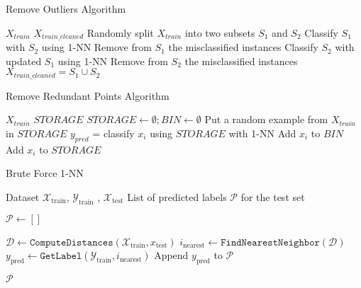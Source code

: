 \documentclass{article}
\theoremstyle{plain}
\theoremstyle{definition}
\theoremstyle{remark}
\begin{document}
    \begin{algorithm}[tb]
        \caption{Remove Outliers Algorithm}
        \label{alg:remove_outliers}
        \begin{algorithmic}
            $X_{train}$
            $X_{train\_cleaned}$
           \STATE Randomly split $X_{train}$ into two subsets $S_1$ and $S_2$
                \STATE Classify $S_1$ with $S_2$ using 1-NN
                \STATE Remove from $S_1$ the misclassified instances
                \STATE Classify $S_2$ with updated $S_1$ using 1-NN
                \STATE Remove from $S_2$ the misclassified instances
           \ENDWHILE
           \STATE $X_{train\_cleaned} = S_1 \cup S_2$
        \end{algorithmic}
    \end{algorithm}

    \begin{algorithm}[tb]
        \caption{Remove Redundant Points Algorithm}
        \label{alg:remove_redundancy}
        \begin{algorithmic}
            $X_{train}$
            $STORAGE$
           \STATE $STORAGE \gets \emptyset ; BIN \gets \emptyset$
           \STATE Put a random example from $X_{train}$ in $STORAGE$
                    \STATE $y_{pred}$ = classify $x_i$ using $STORAGE$ with 1-NN
                        \STATE Add $x_i$ to $BIN$
                    \ELSE
                        \STATE Add $x_i$ to $STORAGE$
                    \ENDIF
                \ENDFOR
           \ENDWHILE
        \end{algorithmic}
    \end{algorithm}

\begin{algorithm}[tb]
   \caption{Brute Force 1-NN}
   \label{alg:brute_force_1nn}
\begin{algorithmic}
    Dataset  $\mathcal{X}_{\text{train}}$, $\mathcal{Y}_{\text{train}}$ , $\mathcal{X}_{\text{test}}$
    List of predicted labels $\mathcal{P}$ for the test set

   \STATE $\mathcal{P} \gets []$

       \STATE $\mathcal{D} \gets \texttt{ComputeDistances}(\mathcal{X}_{\text{train}}, x_{\text{test}})$
       \STATE $i_{\text{nearest}} \gets \texttt{FindNearestNeighbor}(\mathcal{D})$
       \STATE $y_{\text{pred}} \gets \texttt{GetLabel}(\mathcal{Y}_{\text{train}}, i_{\text{nearest}})$
       \STATE Append $y_{\text{pred}}$ to $\mathcal{P}$
   \ENDFOR

    $\mathcal{P}$
\end{algorithmic}
\end{algorithm}
\end{document}
